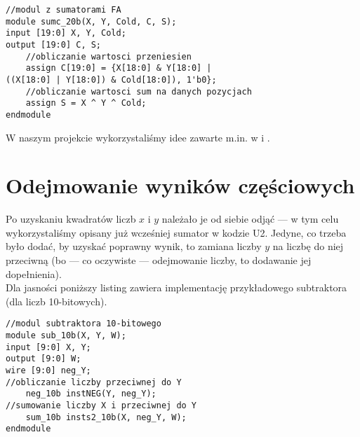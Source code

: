 \documentclass[a4paper]{article}
\begin{document}
\label{sumc20b}
\begin{lstlisting}[label=sumc20b]
//modul z sumatorami FA
module sumc_20b(X, Y, Cold, C, S);
input [19:0] X, Y, Cold;
output [19:0] C, S;
	//obliczanie wartosci przeniesien
	assign C[19:0] = {X[18:0] & Y[18:0] | 
((X[18:0] | Y[18:0]) & Cold[18:0]), 1'b0};
	//obliczanie wartosci sum na danych pozycjach
	assign S = X ^ Y ^ Cold;
endmodule
\end{lstlisting}

 W naszym projekcie wykorzystaliśmy idee zawarte m.in. w \cite{ArytmUklReszt} i \cite{SqrDegign}. 

\section{Odejmowanie wyników częściowych} \label{sub}
Po uzyskaniu kwadratów liczb $x$ i $y$ należało je od siebie odjąć --- w tym celu wykorzystaliśmy opisany już wcześniej sumator w kodzie U2. Jedyne, co trzeba było dodać,
by uzyskać poprawny wynik, to zamiana liczby $y$ na liczbę do niej przeciwną (bo --- co oczywiste --- odejmowanie liczby, to dodawanie jej dopełnienia). \\ \indent
Dla jasności poniższy listing zawiera implementację przykładowego subtraktora (dla liczb 10-bitowych).
\begin{lstlisting}
//modul subtraktora 10-bitowego
module sub_10b(X, Y, W);
input [9:0] X, Y;
output [9:0] W;
wire [9:0] neg_Y;
//obliczanie liczby przeciwnej do Y
	neg_10b instNEG(Y, neg_Y);
//sumowanie liczby X i przeciwnej do Y
	sum_10b insts2_10b(X, neg_Y, W);
endmodule
\end{lstlisting}
\end{document}
